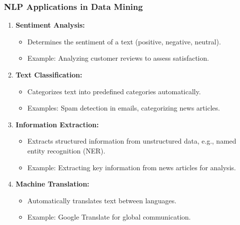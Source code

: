 \documentclass[aspectratio=169]{beamer}
\begin{document}
\begin{frame}[fragile]
    \frametitle{NLP Applications in Data Mining}
    \begin{enumerate}
        \item \textbf{Sentiment Analysis:}
        \begin{itemize}
            \item Determines the sentiment of a text (positive, negative, neutral).
            \item Example: Analyzing customer reviews to assess satisfaction.
        \end{itemize}
        
        \item \textbf{Text Classification:}
        \begin{itemize}
            \item Categorizes text into predefined categories automatically.
            \item Examples: Spam detection in emails, categorizing news articles.
        \end{itemize}
        
        \item \textbf{Information Extraction:}
        \begin{itemize}
            \item Extracts structured information from unstructured data, e.g., named entity recognition (NER).
            \item Example: Extracting key information from news articles for analysis.
        \end{itemize}
        
        \item \textbf{Machine Translation:}
        \begin{itemize}
            \item Automatically translates text between languages.
            \item Example: Google Translate for global communication.
        \end{itemize}
    \end{enumerate}
\end{frame}
\end{document}
